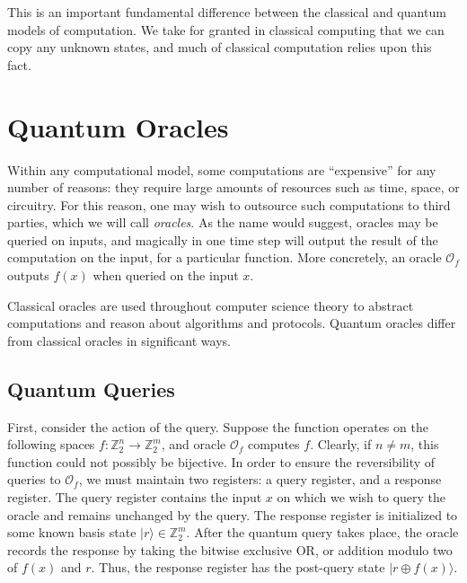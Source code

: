\documentclass[12pt,twoside]{reedthesis}
\theoremstyle{definition}
\newcommand{\Z}{\mathbb{Z}}
\newcommand{\ket}[1]{\ensuremath{\lvert #1\rangle}\xspace}
\begin{document}
This is an important fundamental difference between the classical and quantum models of computation. We take for granted in classical computing that we can copy any unknown states, and much of classical computation relies upon this fact. 

\section{Quantum Oracles}

Within any computational model, some computations are ``expensive'' for any number of reasons: they require large amounts of resources such as time, space, or circuitry. For this reason, one may wish to outsource such computations to third parties, which we will call \textit{oracles}. As the name would suggest, oracles may be queried on inputs, and magically in one time step will output the result of the computation on the input, for a particular function. More concretely, an oracle $\mathcal{O}_f$ outputs $f(x)$ when queried on the input $x$.

Classical oracles are used throughout computer science theory to abstract computations and reason about algorithms and protocols. Quantum oracles differ  from classical oracles in significant ways. 

\subsection{Quantum Queries}
First, consider the action of the query. Suppose the function operates on the following spaces $f: \Z_2^n \rightarrow \Z_2^m$, and oracle $\mathcal{O}_f$ computes $f$. Clearly, if $n \neq m$, this function could not possibly be bijective. In order to ensure the reversibility of queries to $\mathcal{O}_f$, we must maintain two registers: a query register, and a response register. The query register contains the input $x$ on which we wish to query the oracle and remains unchanged by the query. The response register is initialized to some known basis state $\ket{r} \in \Z_2^m$. After the quantum query takes place, the oracle records the response by taking the bitwise exclusive OR, or addition modulo two of $f(x)$ and $r$. Thus, the response register has the post-query state $\ket{r\oplus f(x)}$. 
\end{document}

